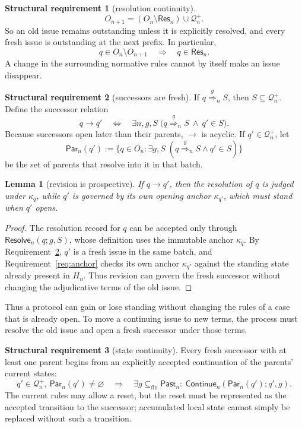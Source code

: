 \documentclass[11pt]{article}
\newtheorem{lemma}{Lemma}
\theoremstyle{definition}
\newtheorem{requirement}{Structural requirement}
\theoremstyle{remark}
\newcommand{\fin}{\subseteq_{\mathrm{fin}}}
\newcommand{\Past}{\mathsf{Past}}
\newcommand{\Resolve}{\mathsf{Resolve}}
\newcommand{\Continue}{\mathsf{Continue}}
\newcommand{\ResSet}{\mathsf{Res}}
\newcommand{\Par}{\mathsf{Par}}
\newcommand{\Born}{\mathcal Q^{+}}
\newcommand{\res}[2]{\overset{#1}{\Longrightarrow}_{#2}}
\begin{document}
\begin{requirement}[resolution continuity]\label{req:resolution-continuity}
\[
 O_{n+1}=(O_n\setminus\ResSet_n)\cup\Born_n.
\]
So an old issue remains outstanding unless it is explicitly resolved, and
every fresh issue is outstanding at the next prefix. In particular,
\[
 q\in O_n\setminus O_{n+1}\quad\Longrightarrow\quad q\in\ResSet_n.
\]
A change in the surrounding normative rules cannot by itself make an issue
disappear.
\end{requirement}

\begin{requirement}[successors are fresh]\label{req:fresh-successors}
If $q\res{g}{n}S$, then $S\subseteq\Born_n$. Define the successor relation
\[
 q\to q'
 \quad\Longleftrightarrow\quad
 \exists n,g,S\;\bigl(q\res{g}{n}S\ \wedge\ q'\in S\bigr).
\]
Because successors open later than their parents, $\to$ is acyclic. If
$q'\in\Born_n$, let
\[
 \Par_n(q'):=\{q\in O_n:\exists g,S\;(q\res{g}{n}S\wedge q'\in S)\}
\]
be the set of parents that resolve into it in that batch.
\end{requirement}

\begin{lemma}[revision is prospective]\label{lem:prospective}
If $q\to q'$, then the resolution of $q$ is judged under $\kappa_q$, while
$q'$ is governed by its own opening anchor $\kappa_{q'}$, which must stand when
$q'$ opens.
\end{lemma}

\begin{proof}
The resolution record for $q$ can be accepted only through
$\Resolve_n(q;g,S)$, whose definition uses the immutable anchor $\kappa_q$. By
Requirement~\ref{req:fresh-successors}, $q'$ is a fresh issue in the same
batch, and Requirement~\ref{req:anchor} checks its own anchor $\kappa_{q'}$
against the standing state already present in $H_n$. Thus revision can govern
the fresh successor without changing the adjudicative terms of the old issue.
\end{proof}

Thus a protocol can gain or lose standing without changing the rules of a case
that is already open. To move a continuing issue to new terms, the process must
resolve the old issue and open a fresh successor under those terms.

\begin{requirement}[state continuity]\label{req:state}
Every fresh successor with at least one parent begins from an explicitly
accepted continuation of the parents' current states:
\[
 q'\in\Born_n,\ \Par_n(q')\neq\varnothing
 \quad\Longrightarrow\quad
 \exists g\fin\Past_n:\ \Continue_n(\Par_n(q');q',g).
\]
The current rules may allow a reset, but the reset must be represented as the
accepted transition to the successor; accumulated local state cannot simply be
replaced without such a transition.
\end{requirement}
\end{document}
